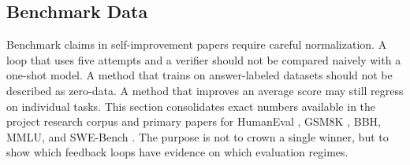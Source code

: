 \subsection{Benchmark Data}
\label{subsec:benchmark-data}

Benchmark claims in self-improvement papers require careful normalization. A loop that uses five attempts and a verifier should not be compared naively with a one-shot model. A method that trains on answer-labeled datasets should not be described as zero-data. A method that improves an average score may still regress on individual tasks. This section consolidates exact numbers available in the project research corpus and primary papers for HumanEval \cite{humaneval2021}, GSM8K \cite{gsm8k2021}, BBH, MMLU, and SWE-Bench \cite{swebench2023}. The purpose is not to crown a single winner, but to show which feedback loops have evidence on which evaluation regimes.

